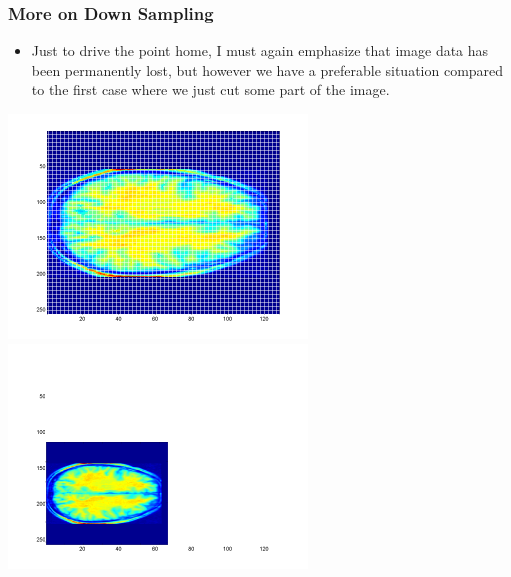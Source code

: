 \documentclass{beamer}
\begin{document}

\begin{frame}
\frametitle{More on Down Sampling}
\begin{itemize}
   \item Just to drive the point home, I must again emphasize that image data has been permanently lost, but however we have a preferable situation compared to the first case where we just cut some part of the image. 
\end{itemize}
\includegraphics[scale=0.5
]{fordeletion.png}
\includegraphics[scale=0.5
]{downsampled.png}
\end{frame}

\end{document}

